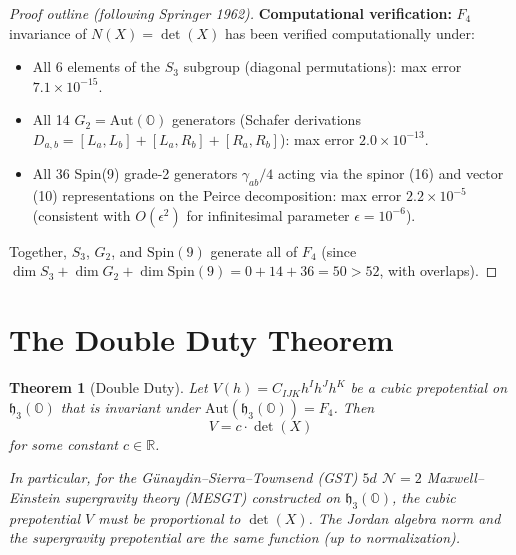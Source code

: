 \documentclass[11pt]{article}
\newtheorem{theorem}{Theorem}
\begin{document}
\begin{proof}[Proof outline (following Springer 1962)]
\textbf{Computational verification:}
$F_4$ invariance of $N(X) = \det(X)$ has been verified computationally under:
\begin{itemize}
\item All 6 elements of the $S_3$ subgroup (diagonal permutations): max error $7.1 \times 10^{-15}$.
\item All 14 $G_2 = \mathrm{Aut}(\mathbb{O})$ generators (Schafer derivations
$D_{a,b} = [L_a, L_b] + [L_a, R_b] + [R_a, R_b]$): max error $2.0 \times 10^{-13}$.
\item All 36 Spin(9) grade-2 generators $\gamma_{ab}/4$ acting via the spinor (16) and
vector (10) representations on the Peirce decomposition: max error $2.2 \times 10^{-5}$
(consistent with $O(\epsilon^2)$ for infinitesimal parameter $\epsilon = 10^{-6}$).
\end{itemize}
Together, $S_3$, $G_2$, and $\mathrm{Spin}(9)$ generate all of $F_4$ (since
$\dim S_3 + \dim G_2 + \dim \mathrm{Spin}(9) = 0 + 14 + 36 = 50 > 52$, with overlaps).
\end{proof}


\section{The Double Duty Theorem}

\begin{theorem}[Double Duty]\label{thm:double-duty}
Let $V(h) = C_{IJK} h^I h^J h^K$ be a cubic prepotential on $\mathfrak{h}_3(\mathbb{O})$
that is invariant under $\mathrm{Aut}(\mathfrak{h}_3(\mathbb{O})) = F_4$. Then
\[
V = c \cdot \det(X)
\]
for some constant $c \in \mathbb{R}$.

In particular, for the G\"unaydin--Sierra--Townsend (GST) $5d$ $\mathcal{N}=2$
Maxwell--Einstein supergravity theory (MESGT) constructed on $\mathfrak{h}_3(\mathbb{O})$,
the cubic prepotential $V$ must be proportional to $\det(X)$. The Jordan algebra norm
and the supergravity prepotential are the \emph{same} function (up to normalization).
\end{theorem}
\end{document}
